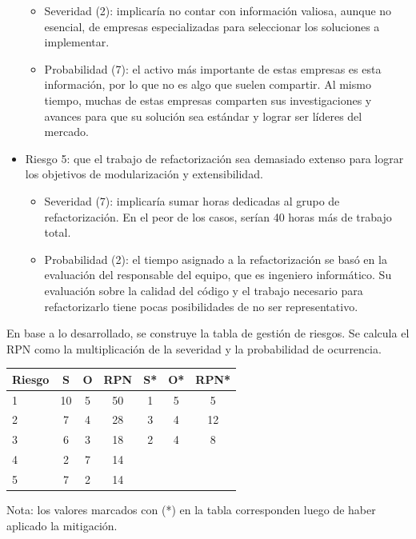 \documentclass[
11pt, %
]{charter}
\begin{document}
\begin{itemize}
\begin{itemize}
\item Severidad (2): implicaría no contar con información valiosa, aunque no esencial, de empresas especializadas para seleccionar los soluciones a implementar. 
\item Probabilidad (7): el activo más importante de estas empresas es esta información, por lo que no es algo que suelen compartir. Al mismo tiempo, muchas de estas empresas comparten sus investigaciones y avances para que su solución sea estándar y lograr ser líderes del mercado.
\end{itemize}
\item Riesgo 5: que el trabajo de refactorización sea demasiado extenso para lograr los objetivos de modularización y extensibilidad.
\begin{itemize}
\item Severidad (7): implicaría sumar horas dedicadas al grupo de refactorización. En el peor de los casos, serían 40 horas más de trabajo total.
\item Probabilidad (2): el tiempo asignado a la refactorización se basó en la evaluación del responsable del equipo, que es ingeniero informático. Su evaluación sobre la calidad del código y el trabajo necesario para refactorizarlo tiene pocas posibilidades de no ser representativo.
\end{itemize}
\end{itemize}

En base a lo desarrollado, se construye la tabla de gestión de riesgos. Se calcula el RPN como
la multiplicación de la severidad y la probabilidad de ocurrencia.

\begin{table}[htpb]
\centering
\begin{tabularx}{\linewidth}{@{}|X|c|c|c|c|c|c|@{}}
\hline
\rowcolor[HTML]{C0C0C0} 
Riesgo & S & O & RPN & S* & O* & RPN* \\ \hline
   1   &  10 & 5  &  50   &  1  &  5  &  5    \\ \hline
   2   &  7 & 4  &   28  &  3  &  4  &   12   \\ \hline
   3   &  6 & 3  &   18  &  2  &   4 &   8   \\ \hline
   4   &  2 & 7 &   14 &    &    &      \\ \hline
   5   &  7 & 2  &  14   &    &    &      \\ \hline
\end{tabularx}%
\end{table}

Nota: los valores marcados con (*) en la tabla corresponden luego de haber aplicado la mitigación.
\end{document}
